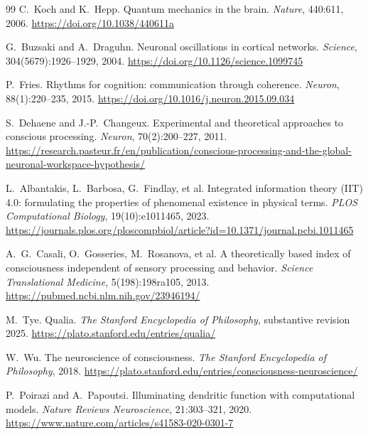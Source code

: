 \documentclass[11pt]{article}
\theoremstyle{remark}
\theoremstyle{plain}
\begin{document}
\begin{thebibliography}{99}
C.\ Koch and K.\ Hepp.
\newblock Quantum mechanics in the brain.
\newblock \emph{Nature}, 440:611, 2006.
\newblock \url{https://doi.org/10.1038/440611a}

G.\ Buzsaki and A.\ Draguhn.
\newblock Neuronal oscillations in cortical networks.
\newblock \emph{Science}, 304(5679):1926--1929, 2004.
\newblock \url{https://doi.org/10.1126/science.1099745}

P.\ Fries.
\newblock Rhythms for cognition: communication through coherence.
\newblock \emph{Neuron}, 88(1):220--235, 2015.
\newblock \url{https://doi.org/10.1016/j.neuron.2015.09.034}

S.\ Dehaene and J.-P.\ Changeux.
\newblock Experimental and theoretical approaches to conscious processing.
\newblock \emph{Neuron}, 70(2):200--227, 2011.
\newblock \url{https://research.pasteur.fr/en/publication/conscious-processing-and-the-global-neuronal-workspace-hypothesis/}

L.\ Albantakis, L.\ Barbosa, G.\ Findlay, et al.
\newblock Integrated information theory (IIT) 4.0: formulating the properties of phenomenal existence in physical terms.
\newblock \emph{PLOS Computational Biology}, 19(10):e1011465, 2023.
\newblock \url{https://journals.plos.org/ploscompbiol/article?id=10.1371/journal.pcbi.1011465}

A.\ G.\ Casali, O.\ Gosseries, M.\ Rosanova, et al.
\newblock A theoretically based index of consciousness independent of sensory processing and behavior.
\newblock \emph{Science Translational Medicine}, 5(198):198ra105, 2013.
\newblock \url{https://pubmed.ncbi.nlm.nih.gov/23946194/}

M.\ Tye.
\newblock Qualia.
\newblock \emph{The Stanford Encyclopedia of Philosophy}, substantive revision 2025.
\newblock \url{https://plato.stanford.edu/entries/qualia/}

W.\ Wu.
\newblock The neuroscience of consciousness.
\newblock \emph{The Stanford Encyclopedia of Philosophy}, 2018.
\newblock \url{https://plato.stanford.edu/entries/consciousness-neuroscience/}

P.\ Poirazi and A.\ Papoutsi.
\newblock Illuminating dendritic function with computational models.
\newblock \emph{Nature Reviews Neuroscience}, 21:303--321, 2020.
\newblock \url{https://www.nature.com/articles/s41583-020-0301-7}


\end{thebibliography}
\end{document}
